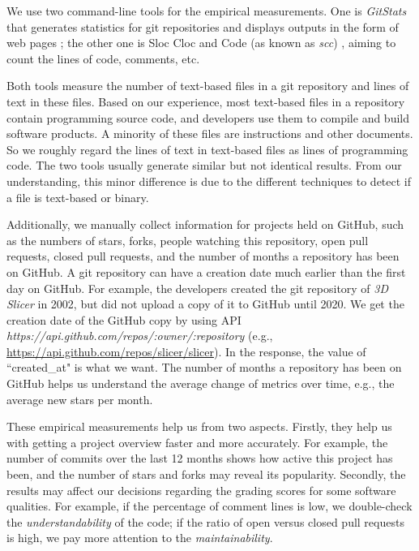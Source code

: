 \documentclass[3p, 12pt,authoryear]{elsarticle}
\begin{document}
We use two command-line tools for the empirical measurements. One is
\textit{GitStats} that generates statistics for git repositories and displays
outputs in the form of web pages \citep{Gieniusz2019}; the other one is Sloc Cloc
and Code (as known as \textit{scc}) \citep{Boyter2021}, aiming to count the lines
of code, comments, etc.

Both tools measure the number of text-based files in a git repository and lines
of text in these files. Based on our experience, most text-based files in a
repository contain programming source code, and developers use them to compile
and build software products. A minority of these files are instructions and
other documents. So we roughly regard the lines of text in text-based files as
lines of programming code. The two tools usually generate similar but not
identical results. From our understanding, this minor difference is due to the
different techniques to detect if a file is text-based or binary.

Additionally, we manually collect information for projects held on GitHub, such
as the numbers of stars, forks, people watching this repository, open pull
requests, closed pull requests, and the number of months a repository has been
on GitHub. A git repository can have a creation date much earlier than the first
day on GitHub. For example, the developers created the git repository of
\textit{3D Slicer} in 2002, but did not upload a copy of it to GitHub until
2020. We get the creation date of the GitHub copy by using API
\textit{https://api.github.com/repos/{:owner}/{:repository}} (e.g.,
\hyperlink{https://api.github.com/repos/slicer/slicer}{https://api.github.com/repos/slicer/slicer}).
In the response, the value of ``created\_at" is what we want. The number of
months a repository has been on GitHub helps us understand the average change of
metrics over time, e.g., the average new stars per month. 

These empirical measurements help us from two aspects. Firstly, they help us
with getting a project overview faster and more accurately. For example, the
number of commits over the last 12 months shows how active this project has
been, and the number of stars and forks may reveal its popularity. Secondly, the
results may affect our decisions regarding the grading scores for some software
qualities. For example, if the percentage of comment lines is low, we
double-check the \textit{understandability} of the code; if the ratio of open
versus closed pull requests is high, we pay more attention to the
\textit{maintainability}.
\end{document}
